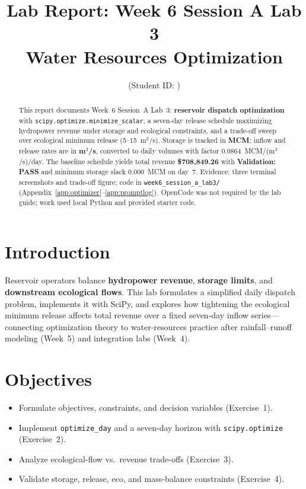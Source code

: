 \documentclass[11pt,a4paper]{article}
\title{Lab Report: Week 6 Session A Lab 3\\Water Resources Optimization}
\author{\studentname \quad (Student ID: \studentid)}
\date{\reportdate}
\begin{document}
\maketitle

\begin{abstract}
This report documents Week~6 Session~A Lab~3: \textbf{reservoir dispatch optimization} with \texttt{scipy.optimize.minimize\_scalar}, a seven-day release schedule maximizing hydropower revenue under storage and ecological constraints, and a trade-off sweep over ecological minimum release (5--15~m$^3$/s). Storage is tracked in \textbf{MCM}; inflow and release rates are in \textbf{m$^3$/s}, converted to daily volumes with factor 0.0864~MCM/(m$^3$/s)/day. The baseline schedule yields total revenue \textbf{\$708,849.26} with \textbf{Validation: PASS} and minimum storage slack 0.000~MCM on day~7. Evidence: three terminal screenshots and trade-off figure; code in \texttt{week6\_session\_a\_lab3/} (Appendix~\ref{app:optimizer}--\ref{app:promptlog}). OpenCode was not required by the lab guide; work used local Python and provided starter code.
\end{abstract}

\section{Introduction}
Reservoir operators balance \textbf{hydropower revenue}, \textbf{storage limits}, and \textbf{downstream ecological flows}. This lab formulates a simplified daily dispatch problem, implements it with SciPy, and explores how tightening the ecological minimum release affects total revenue over a fixed seven-day inflow series---connecting optimization theory to water-resources practice after rainfall--runoff modeling (Week~5) and integration labs (Week~4).

\section{Objectives}
\begin{itemize}[noitemsep]
  \item Formulate objectives, constraints, and decision variables (Exercise~1).
  \item Implement \texttt{optimize\_day} and a seven-day horizon with \texttt{scipy.optimize} (Exercise~2).
  \item Analyze ecological-flow vs.\ revenue trade-offs (Exercise~3).
  \item Validate storage, release, eco, and mass-balance constraints (Exercise~4).
\end{itemize}
\end{document}
